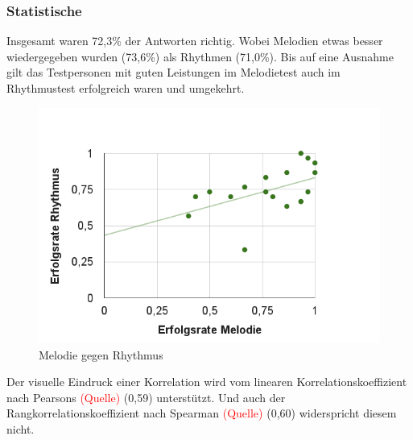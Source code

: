 \documentclass{acm_proc_article-sp}
\begin{document}
\subsubsection{Statistische}
Insgesamt waren 72,3\% der Antworten richtig. Wobei Melodien etwas besser wiedergegeben wurden (73,6\%) als Rhythmen (71,0\%). Bis auf eine Ausnahme gilt das Testpersonen mit guten Leistungen im Melodietest auch im Rhythmustest erfolgreich waren und umgekehrt.
\begin{figure}[H]
\includegraphics[width=1.0\linewidth]{Abbildungen/Melodie-Rhythmus.png}
\caption{Melodie gegen Rhythmus}
\label{Alter}
\end{figure}
Der visuelle Eindruck einer Korrelation wird vom linearen Korrelationskoeffizient nach Pearsons \textcolor{red}{(Quelle)} (0,59) unterstützt. Und auch der Rangkorrelationskoeffizient nach Spearman \textcolor{red}{(Quelle)} (0,60) widerspricht diesem nicht.\\
\end{document}
